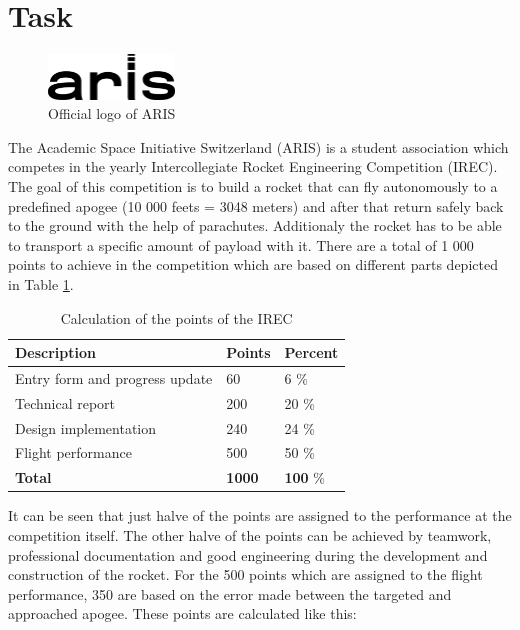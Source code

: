 
 \section{Task}

 \begin{figure}[h!]
 \centering
 \includegraphics[width=0.3\textwidth]{./Pictures/ARIS_logo.png}
 \caption{Official logo of ARIS \cite{ARIS}}
 \label{fig:ArisLogo}
\end{figure}

 The Academic Space Initiative Switzerland (ARIS) is a student association which competes in the yearly Intercollegiate Rocket Engineering Competition (IREC).
 The goal of this competition is to build a rocket that can fly autonomously to a predefined apogee (10 000 feets = 3048 meters) and after that return safely back to the ground with the help of parachutes.
 Additionaly the rocket has to be able to transport a specific amount of payload with it.
 There are a total of 1 000 points to achieve in the competition which are based on different parts depicted in Table \ref{tab:CompetitionCalculation}.

\begin{table}[h]
\centering
\begin{tabular}{|l|l|l|}\hline
{\bf Description} & {\bf Points} & {\bf Percent}\\\hline
Entry form and progress update & 60 & 6 \% \\ \hline
Technical report & 200 & 20 \% \\ \hline
Design implementation & 240 & 24 \% \\ \hline
Flight performance & 500 & 50 \% \\ \hline
{\bf Total} & {\bf 1000} & {\bf 100} \% \\ \hline
\end{tabular}
\caption{Calculation of the points of the IREC}
\label{tab:CompetitionCalculation}
\end{table}


 It can be seen that just halve of the points are assigned to the performance at the competition itself.
 The other halve of the points can be achieved by teamwork, professional documentation and good engineering during the development and construction of the rocket.
 For the 500 points which are assigned to the flight performance, 350 are based on the error made between the targeted and approached apogee.
 These points are calculated like this:

